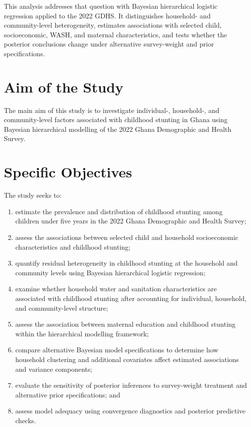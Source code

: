 This analysis addresses that question with Bayesian hierarchical logistic regression applied to the 2022 GDHS. It distinguishes household- and community-level heterogeneity, estimates associations with selected child, socioeconomic, WASH, and maternal characteristics, and tests whether the posterior conclusions change under alternative survey-weight and prior specifications.

\section{Aim of the Study}

The main aim of this study is to investigate individual-, household-, and community-level factors associated with childhood stunting in Ghana using Bayesian hierarchical modelling of the 2022 Ghana Demographic and Health Survey.

\section{Specific Objectives}

The study seeks to:

\begin{enumerate}
    \item estimate the prevalence and distribution of childhood stunting among children under five years in the 2022 Ghana Demographic and Health Survey;
    \item assess the associations between selected child and household socioeconomic characteristics and childhood stunting;
    \item quantify residual heterogeneity in childhood stunting at the household and community levels using Bayesian hierarchical logistic regression;
    \item examine whether household water and sanitation characteristics are associated with childhood stunting after accounting for individual, household, and community-level structure;
    \item assess the association between maternal education and childhood stunting within the hierarchical modelling framework;
    \item compare alternative Bayesian model specifications to determine how household clustering and additional covariates affect estimated associations and variance components;
    \item evaluate the sensitivity of posterior inferences to survey-weight treatment and alternative prior specifications; and
    \item assess model adequacy using convergence diagnostics and posterior predictive checks.
\end{enumerate}

